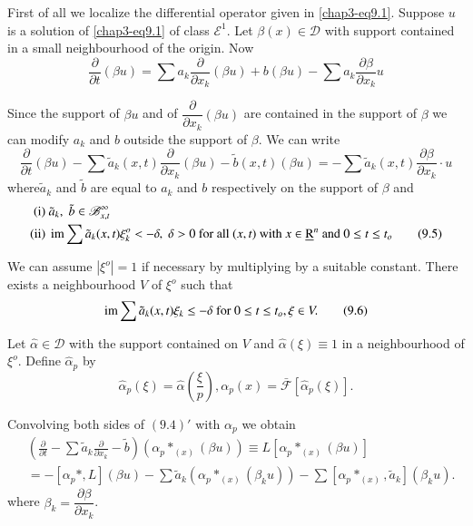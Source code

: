  First of all we localize the differential operator given in
 \eqref{chap3-eq9.1}. Suppose $u$ is a solution of \eqref{chap3-eq9.1}
 of class  $\mathscr{E}^1$. Let 
 $\beta (x) \in \mathscr{D}$ with support contained in a small
 neighbourhood of the origin. Now 
 \begin{equation}
\frac{\partial}{\partial t} (\beta  u) = \sum a_k
\frac{\partial}{\partial x_k} (\beta u) +  b (\beta u) - \sum a_k
\frac{\partial \beta}{\partial x_k} u \tag{9.4} \label{chap3-eq9.4}
\end{equation} 

 Since the support of $\beta u$ and of $\dfrac{\partial}{\partial
   x_k}(\beta u)$ are contained in the support of $\beta$ we can
 modify $a_k$ and $b$ outside the support of $\beta$. We can write 
 \begin{equation*}
\frac{\partial}{\partial t} (\beta u) - \sum \tilde{a}_k (x, t)
\frac{\partial}{\partial x_k} (\beta u) - \tilde{b} (x,t) (\beta u)
=- \sum \tilde{a}_k (x,t) \frac{\partial \beta}{\partial x_k} \cdot u
\tag*{$(9.4)'$} 
 \end{equation*} 
 where\pageoriginale $\tilde{a}_k$ and $\tilde{b}$ are equal to $a_k$
 and $b$ respectively on the support of $\beta$ and   
\begin{align*}
{\rm(i)}~  &  \tilde{a}_k,  \; \tilde{b} \in \mathscr{B}^\infty_{x, t} \\
{\rm(ii)}~ &  \operatorname{im} \sum \tilde{a}_k (x,t) \xi^o_k  < - \delta, \; \delta > 0
  \text{ for all }(x,t) \text{ with } x \in  \underbar{R}^n \text{ and
  } 0 \le t \le t_o \tag{9.5} \label{chap3-eq9.5}
\end{align*}

We can assume $|\xi^o| = 1$ if necessary by multiplying by a
suitable constant. There exists a neighbourhood $V$ of $\xi^o$ such
that  
\begin{equation}
\operatorname{im}  \sum \tilde{a}_k (x,t) \xi_k \le - \delta \text{ for } 0 \le t
\le t_o, \xi \in V. \tag{9.6}  \label{chap3-eq9.6}
\end{equation}

Let $\hat{\alpha} \in \mathscr{D}$ with the support contained on $V$
and $\hat{\alpha}(\xi) \equiv 1$ in a neighbourhood of $\xi^o$. Define
$\hat{\alpha}_p$ by 
\begin{equation}
\hat{\alpha}_p (\xi) = \hat{\alpha} ( \frac{\xi}{p}), \alpha_p (x) =
\bar{\mathscr{F}} [\hat{\alpha}_p (\xi ) ]. \tag{9.7} \label{chap3-eq9.7}
 \end{equation} 
 
Convolving both sides of $(9.4)'$ with $\alpha_p$ we obtain
 \begin{align*}
& \left(\frac{\partial}{\partial t} - \sum \tilde{a}_k
   \frac{\partial}{\partial x_k} - \tilde{b} \right) \left(\alpha_p
   *_{(x)} (\beta  u) \right) \equiv L \left[ \alpha_p *_{(x)} (\beta
     u) \right] \\
&= - \left[ \alpha_p *, L \right](\beta u) - \sum \tilde{a}_k
   (\alpha_p 
   *_{(x)}(\beta_k u)) - \sum \left[\alpha_p *_{(x)}, \tilde{a}_k
     \right] (\beta_k  u). \tag{9.8} \label{chap3-eq9.8}
\end{align*}
where $\beta_k = \dfrac{\partial\beta}{\partial x_k}$.
 
